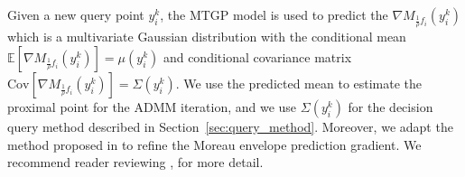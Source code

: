 \documentclass[conference]{IEEEtran}
\newcommand{\AD}[1]{}
\newcommand{\Long}[1]{}
\begin{document}

Given a new query point $y_{i}^k$, the MTGP model is used to predict the $\nabla M_{\frac{1}{\rho}f_i}(y_i^k)$ which is a multivariate Gaussian distribution with the conditional mean $\mathbb{E}[\nabla M_{\frac{1}{\rho}f_i}(y_i^k)] = \mu(y_i^k)$ and conditional covariance matrix $\mathrm{Cov}[\nabla M_{\frac{1}{\rho}f_i}(y_i^k)] = \Sigma(y_i^k)$. 
We use the predicted mean to estimate the proximal point for the ADMM iteration, and we use $\Sigma(y_i^k)$ for the decision query method described in Section~\ref{sec:query_method}. 
Moreover, we adapt the method proposed in \cite{stathopoulos2018communicationreductiondistributedoptimization, 8635898} to refine the Moreau envelope prediction gradient. We recommend reader reviewing \cite{stathopoulos2018communicationreductiondistributedoptimization}, \cite[Section~III-C]{8635898} for more detail.



\end{document}
